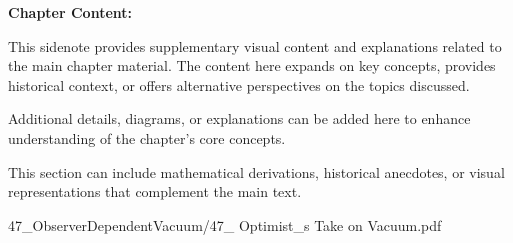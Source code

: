 \begin{SideNotePage}{
  \textbf{Chapter Content:} \par
  This sidenote provides supplementary visual content and explanations related to the main chapter material. The content here expands on key concepts, provides historical context, or offers alternative perspectives on the topics discussed.

  \vspace{0.5em}
  Additional details, diagrams, or explanations can be added here to enhance understanding of the chapter's core concepts.

  \vspace{0.5em}
  This section can include mathematical derivations, historical anecdotes, or visual representations that complement the main text.
}{47_ObserverDependentVacuum/47_ Optimist_s Take on Vacuum.pdf}
\end{SideNotePage}
